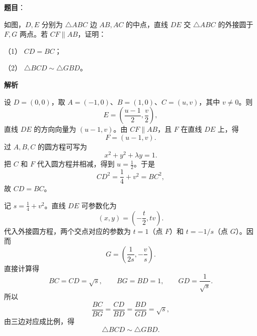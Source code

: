 \begin{answer}

\textbf{题目}：

如图，$D,E$ 分别为 $\triangle ABC$ 边 $AB,AC$ 的中点，直线 $DE$ 交 $\triangle ABC$ 的外接圆于 $F,G$ 两点。若 $CF\parallel AB$，证明：
\nopagebreak[4]
\begin{center}\end{center}
\nopagebreak[4]
（1） $CD=BC$；

（2） $\triangle BCD\sim\triangle GBD$。

\textbf{解析}


设 $D=(0,0)$，取 $A=(-1,0)$、$B=(1,0)$、$C=(u,v)$，其中 $v\ne0$。则
\nopagebreak[4]
\[
E=\left(\frac{u-1}{2},\frac v2\right),
\]
直线 $DE$ 的方向向量为 $(u-1,v)$。由 $CF\parallel AB$，且 $F$ 在直线 $DE$ 上，得
\nopagebreak[4]
\[
F=(u-1,v).
\]
过 $A,B,C$ 的圆方程可写为
\nopagebreak[4]
\[
x^2+y^2+\lambda y=1.
\]
把 $C$ 和 $F$ 代入圆方程并相减，得到 $u=\frac12$。于是
\nopagebreak[4]
\[
CD^2=\frac14+v^2=BC^2,
\]
故 $CD=BC$。


记 $s=\frac14+v^2$。直线 $DE$ 可参数化为
\nopagebreak[4]
\[
(x,y)=\left(-\frac t2,tv\right).
\]
代入外接圆方程，两个交点对应的参数为 $t=1$（点 $F$）和 $t=-1/s$（点 $G$）。因而
\nopagebreak[4]
\[
G=\left(\frac1{2s},-\frac v s\right).
\]
直接计算得
\nopagebreak[4]
\[
BC=CD=\sqrt s,\qquad BG=BD=1,\qquad GD=\frac1{\sqrt s}.
\]
所以
\nopagebreak[4]
\[
\frac{BC}{BG}=\frac{CD}{BD}=\frac{BD}{GD}=\sqrt s,
\]
由三边对应成比例，得
\nopagebreak[4]
\[
\triangle BCD\sim\triangle GBD.
\]



\end{answer}

